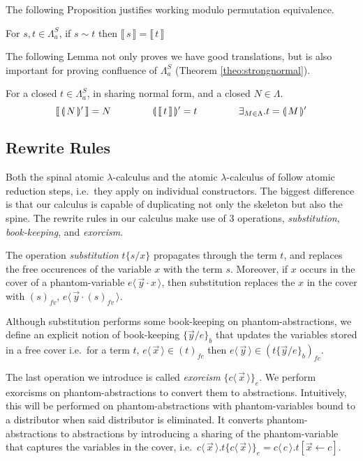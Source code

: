 \documentclass[a4paper,UKenglish,cleveref, autoref]{lipics-v2019}
\newcommand{\FALC}{\Lambda^{S}_{a}}
\newcommand{\fv}[1]{(#1)_{fv}}
\newcommand{\fc}[1]{(#1)_{fc}}
\newcommand{\fake}[3]{#1 \langle \, #2 \, \rangle . #3}
\newcommand{\share}[3]{#1 [#2 \leftarrow #3]}
\newcommand{\fakedist}[2]{#1 \langle \, #2 \, \rangle}
\newcommand{\sub}[3]{#1 \{ #2 / #3 \}}
\newcommand{\psub}[3]{#1 \{ #2 / #3 \}_{b}}
\newcommand{\exor}[3]{#1 \{ \fakedist{#2}{#3} \}_{e}}
\newcommand{\readback}[2]{\llbracket \, #1 \, \rrbracket}
\newcommand{\compile}[1]{\llparenthesis \, #1 \, \rrparenthesis}
\newcommand{\trans}[1]{\llbracket \, #1 \, \rrbracket}
\begin{document}
\noindent The following Proposition justifies working modulo permutation equivalence.

\begin{proposition}
\label{lem:preservedenotationsim}
For $s, t \in \FALC$, if $s \sim t$ then $\trans{s} = \trans{t}$
\end{proposition}

\noindent The following Lemma not only proves we have good translations, but is also important for proving confluence of $\FALC$ (Theorem \ref{theo:strongnormal}).

\begin{lemma}
\label{lem:preserve1to1correspondance}
For a closed $t \in \FALC$, in sharing normal form, and a closed $N \in \Lambda$.
$$\readback{\compile{N}'}{I} = N \hspace{1.5cm} \compile{\readback{t}{I}}' = t \hspace{1.5cm} \exists_{ M \in \Lambda} . t = \compile{M}'$$
\end{lemma}

\subsection{Rewrite Rules}

Both the spinal atomic $\lambda$-calculus and the atomic $\lambda$-calculus of \cite{gundersen2013atomic} follow atomic reduction steps, i.e.\ they apply on individual constructors. The biggest difference is that our calculus is capable of duplicating not only the skeleton but also the spine. The rewrite rules in our calculus make use of 3 operations, \emph{substitution}, \emph{book-keeping}, and \emph{exorcism}.

The operation \emph{substitution} $\sub{t}{s}{x}$ propagates through the term $t$, and replaces the free occurences of the variable $x$ with the term $s$. Moreover, if $x$ occurs in the cover of a phantom-variable $\fakedist{e}{\vec{y} \cdot x}$, then substitution replaces the $x$ in the cover with $\fv{s}$, $\fakedist{e}{\vec{y} \cdot \fv{s}}$.

Although substitution performs some book-keeping on phantom-abstractions, we define an explicit notion of book-keeping $\psub{}{\vec{y}}{e}$ that updates the variables stored in a free cover i.e.\ for a term $t$, $\fakedist{e}{\vec{x}} \in \fc{t}$ then $\fakedist{e}{\vec{y}} \in \fc{\psub{t}{\vec{y}}{e}}$.

The last operation we introduce is called \emph{exorcism} $\exor{}{c}{\vec{x}}$. We perform exorcisms on phantom-abstractions to convert them to abstractions. Intuitively, this will be performed on phantom-abstractions with phantom-variables bound to a distributor when said distributor is eliminated. It converts phantom-abstractions to abstractions by introducing a sharing of the phantom-variable that captures the variables in the cover, i.e.\ $\fake{c}{\vec{x}}{t} \exor{}{c}{\vec{x}} = \fake{c}{c}{\share{t}{\vec{x}}{c}}$.
\end{document}
